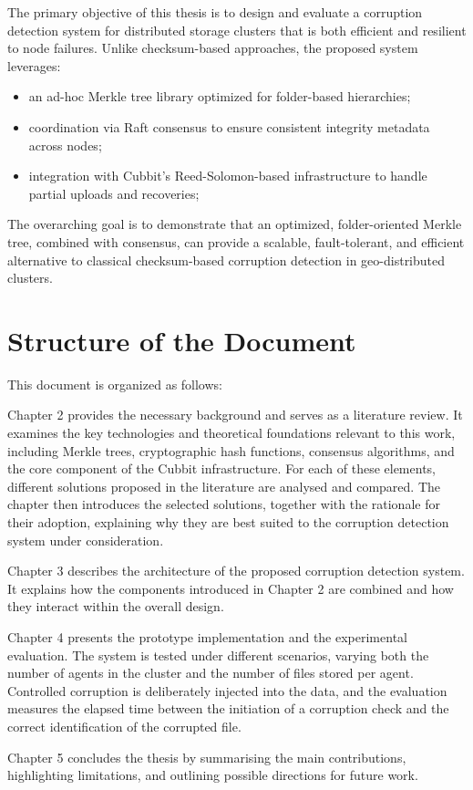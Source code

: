 The primary objective of this thesis is to design and evaluate a corruption detection system for distributed storage clusters that is both efficient and resilient to node failures. Unlike checksum-based approaches, the proposed system leverages:  
\begin{itemize}
    \item an ad-hoc Merkle tree library optimized for folder-based hierarchies;  
    \item coordination via Raft consensus to ensure consistent integrity metadata across nodes;  
    \item integration with Cubbit's Reed-Solomon-based infrastructure to handle partial uploads and recoveries;  
\end{itemize}

The overarching goal is to demonstrate that an optimized, folder-oriented Merkle tree, combined with consensus, can provide a scalable, fault-tolerant, and efficient alternative to classical checksum-based corruption detection in geo-distributed clusters.


\section{Structure of the Document}

This document is organized as follows:

Chapter 2 provides the necessary background and serves as a literature review. It examines the key technologies and theoretical foundations relevant to this work, including Merkle trees, cryptographic hash functions, consensus algorithms, and the core component of the Cubbit infrastructure. For each of these elements, different solutions proposed in the literature are analysed and compared. The chapter then introduces the selected solutions, together with the rationale for their adoption, explaining why they are best suited to the corruption detection system under consideration.
    
Chapter 3 describes the architecture of the proposed corruption detection system. It explains how the components introduced in Chapter 2 are combined and how they interact within the overall design.

Chapter 4 presents the prototype implementation and the experimental evaluation. The system is tested under different scenarios, varying both the number of agents in the cluster and the number of files stored per agent. Controlled corruption is deliberately injected into the data, and the evaluation measures the elapsed time between the initiation of a corruption check and the correct identification of the corrupted file.

Chapter 5 concludes the thesis by summarising the main contributions, highlighting limitations, and outlining possible directions for future work.
